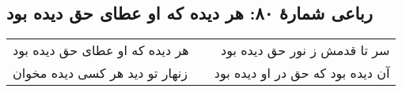 \begin{center}
\section*{رباعی شمارهٔ ۸۰: هر دیده که او عطای حق دیده بود}
\label{sec:080}
\begin{longtable}{l p{0.5cm} r}
هر دیده که او عطای حق دیده بود
&&
سر تا قدمش ز نور حق دیده بود 
\\
زنهار تو دید هر کسی دیده مخوان
&&
آن دیده بود که حق در او دیده بود 
\\
\end{longtable}
\end{center}
